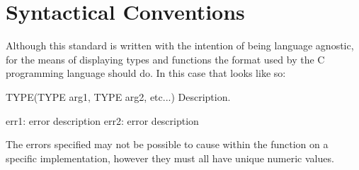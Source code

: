 \chapter{Syntactical Conventions}

\noindent Although this standard is written with the intention of being
language agnostic, for the means of displaying types and functions the format
used by the C programming language should do. In this case that looks like so:

{}
\code
TYPE(TYPE arg1, TYPE arg2, etc...)\cr
\ecode
\noindent Description.

\error err1: error description
\error err2: error description
\edefinitions

\noindent The errors specified may not be possible to cause within the
function on a specific implementation, however they must all have unique
numeric values.

